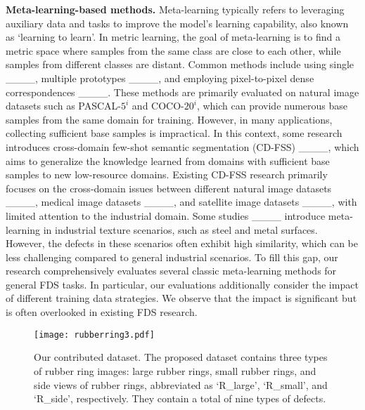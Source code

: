 \noindent \textbf{Meta-learning-based methods.} Meta-learning typically refers to leveraging auxiliary data and tasks to improve the model's learning capability, also known as `learning to learn'. In metric learning, the goal of meta-learning is to find a metric space where samples from the same class are close to each other, while samples from different classes are distant. Common methods include using single ____, multiple prototypes ____, and employing pixel-to-pixel dense correspondences ____. These methods are primarily evaluated on natural image datasets such as PASCAL-$5^i$ and COCO-$20^i$, which can provide numerous base samples from the same domain for training. However, in many applications, collecting sufficient base samples is impractical. In this context, some research introduces cross-domain few-shot semantic segmentation (CD-FSS) ____, which aims to generalize the knowledge learned from domains with sufficient base samples to new low-resource domains. Existing CD-FSS research primarily focuses on the cross-domain issues between different natural image datasets ____, medical image datasets ____, and satellite image datasets ____, with limited attention to the industrial domain. Some studies ____ introduce meta-learning in industrial texture scenarios, such as steel and metal surfaces. However, the defects in these scenarios often exhibit high similarity, which can be less challenging compared to general industrial scenarios. To fill this gap, our research comprehensively evaluates several classic meta-learning methods for general FDS tasks. In particular, our evaluations additionally consider the impact of different training data strategies. We observe that the impact is significant but is often overlooked in existing FDS research.


\begin{figure*}[tbp]
    \centering
    \texttt{[image: rubberring3.pdf]}
	\caption{Our contributed dataset. The proposed dataset contains three types of rubber ring images: large rubber rings, small rubber rings, and side views of rubber rings, abbreviated as `R\_large', `R\_small', and `R\_side', respectively. They contain a total of nine types of defects.}
	\label{rubberring_dataset}
\end{figure*}

